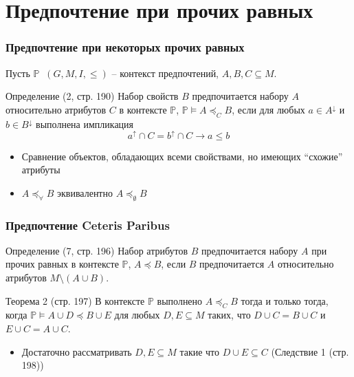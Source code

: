 \documentclass{beamer}
\newcommand{\eng}[1]{\foreignlanguage{english}{#1}}
\newcommand{\brac}[1]{\left ( #1 \right )}
\newcommand{\defn}{\mathop{\overset{\Delta}{=}}\nolimits}
\begin{document}
\section{Предпочтение при прочих равных} %
\label{sec:ceteris_paribus}

\begin{frame}\frametitle{Предпочтение при некоторых прочих равных}
  Пусть $\mathbb{P}\defn \brac{G, M, I, \leq}$ -- контекст предпочтений,  $A,B,C\subseteq M$.
  \begin{block}{Определение (2, стр. 190)}
    Набор свойств $B$ предпочитается набору $A$ относительно атрибутов $C$ в контексте $\mathbb{P}$, $\mathbb{P} \models A\preceq_C B$, если для любых $a\in A^\downarrow$ и $b\in B^\downarrow$ выполнена импликация \[ a^\uparrow \cap C = b^\uparrow \cap C \rightarrow a \leq b\]
  \end{block}
  \begin{itemize}
    \item Сравнение объектов, обладающих всеми свойствами, но имеющих ``схожие'' атрибуты
    \item $A\preceq_\forall B$ эквивалентно $A\preceq_\emptyset B$
  \end{itemize}
\end{frame}

\begin{frame}\frametitle{Предпочтение \eng{Ceteris Paribus}}
  \begin{block}{Определение (7, стр. 196)}
    Набор атрибутов $B$ предпочитается набору $A$ при прочих равных в контексте $\mathbb{P}$, $A\preceq B$, если $B$ предпочитается $A$ относительно атрибутов $M\setminus (A\cup B)$.
  \end{block}
  \begin{block}{Теорема 2 (стр. 197)}
    В контексте $\mathbb{P}$ выполнено $A\preceq_C B$ тогда и только тогда, когда $\mathbb{P}\models A\cup D\preceq B\cup E$ для любых $D, E\subseteq M$ таких, что $D\cup C = B\cup C$ и $E\cup C = A\cup C$.
  \end{block}
  \begin{itemize}
    \item Достаточно рассматривать $D,E\subseteq M$ такие что $D\cup E\subseteq C$ (Следствие 1 (стр. 198))
  \end{itemize}
\end{frame}

\end{document}
